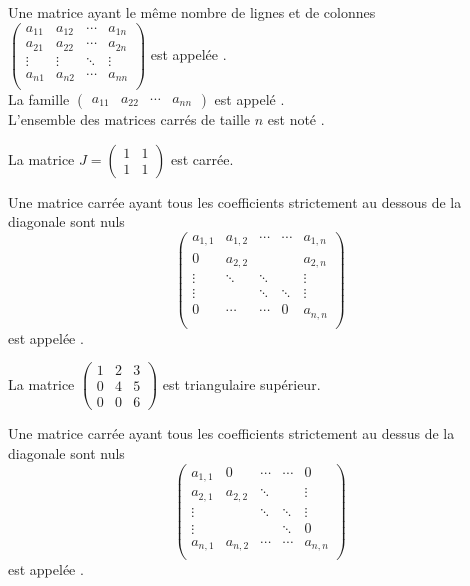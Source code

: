 \documentclass{book}
\begin{document}
\begin{Definition}
Une matrice ayant le même nombre de lignes et de colonnes $\begin{pmatrix}
a_{11} & a_{12} & \cdots & a_{1n}\\
a_{21} & a_{22} & \cdots & a_{2n}\\
\vdots & \vdots & \ddots & \vdots\\
a_{n1} & a_{n2} & \cdots & a_{nn}\\
\end{pmatrix}$ est appelée .\\
La famille $\begin{pmatrix}
a_{11}&a_{22}&\cdots&a_{nn}
\end{pmatrix}$ est appelé .\\ 
L'ensemble des matrices carrés de taille $n$ est noté .\\
\end{Definition}
\begin{Exemple}
La matrice $J= \begin{pmatrix}1&1\\1&1\end{pmatrix}$ est carrée.
\end{Exemple}
\begin{Definition}
Une matrice carrée ayant tous les coefficients strictement au dessous de la
diagonale sont nuls 
$$\begin{pmatrix}a_{1,1}&a_{1,2}&\cdots &\cdots &a_{1,n}\\0&a_{2,2}&&&a_{2,n}\\\vdots &\ddots &\ddots &&\vdots \\\vdots &&\ddots &\ddots &\vdots \\0&\cdots &\cdots &0&a_{n,n}\\\end{pmatrix}$$ est appelée .
\end{Definition}
\begin{Exemple}
La matrice $\begin{pmatrix}1&2&3\\0&4&5\\0&0&6\end{pmatrix}$ est triangulaire supérieur.
\end{Exemple}
\begin{Definition}
Une matrice carrée ayant tous les coefficients strictement au dessus de la
diagonale sont nuls 
$$\begin{pmatrix}a_{1,1}&0&\cdots &\cdots &0\\a_{2,1}&a_{2,2}&\ddots &&\vdots \\\vdots &&\ddots &\ddots &\vdots \\\vdots &&&\ddots &0\\a_{n,1}&a_{n,2}&\cdots &\cdots &a_{n,n}\\\end{pmatrix}$$ est appelée .
\end{Definition}
\end{document}
